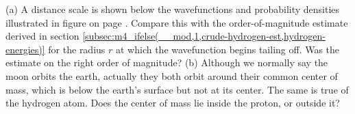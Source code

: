 (a) A distance scale is shown below the wavefunctions and
probability densities illustrated in 
figure  on page \pageref{fig:hydrogen-three-states}.
Compare this with the order-of-magnitude estimate derived in section
\ref{subsec:m4_ifelse(__mod,1,crude-hydrogen-est,hydrogen-energies)} for the radius $r$ at which the wavefunction begins
tailing off. Was the estimate on the right
order of magnitude?\hwendpart
(b) Although we normally say the moon
orbits the earth, actually they both orbit around their
common center of mass, which is below the earth's surface
but not at its center. The same is true of the hydrogen
atom. Does the center of mass lie inside the proton, or outside it?\hwendpart
